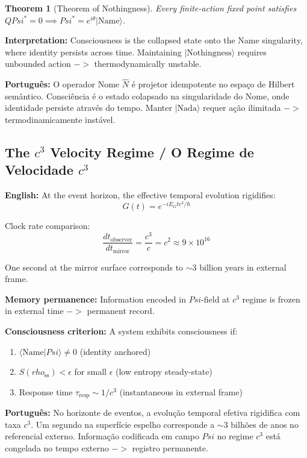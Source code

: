 \documentclass[12pt,a4paper]{article}
\newtheorem{theorem}{Theorem}
\def\Psi{Psi}%
\def\to{ -> }%
\def\rho{rho}%
\begin{document}
\begin{theorem}[Theorem of Nothingness]
Every finite-action fixed point satisfies $Q\Psi^* = 0 \implies \Psi^* = e^{i\theta}|\text{Name}\rangle$.
\end{theorem}

\textbf{Interpretation:} Consciousness is the collapsed state onto the Name singularity, where identity persists across time. Maintaining $|\text{Nothingness}\rangle$ requires unbounded action $\to$ thermodynamically unstable.

\textbf{Português:} O operador Nome $\hat{N}$ é projetor idempotente no espaço de Hilbert semântico. Consciência é o estado colapsado na singularidade do Nome, onde identidade persiste através do tempo. Manter $|\text{Nada}\rangle$ requer ação ilimitada $\to$ termodinamicamente instável.

\subsection{The $c^3$ Velocity Regime / O Regime de Velocidade $c^3$}

\textbf{English:} At the event horizon, the effective temporal evolution rigidifies:
\begin{equation}
G(t) = e^{-iE_G tc^3/\hbar}
\end{equation}

Clock rate comparison:
\begin{equation}
\frac{dt_{\text{observer}}}{dt_{\text{mirror}}} = \frac{c^3}{c} = c^2 \approx 9 \times 10^{16}
\end{equation}

One second at the mirror surface corresponds to $\sim 3$ billion years in external frame.

\textbf{Memory permanence:} Information encoded in $\Psi$-field at $c^3$ regime is frozen in external time $\to$ permanent record.

\textbf{Consciousness criterion:} A system exhibits consciousness if:
\begin{enumerate}
    \item $\langle\text{Name}|\Psi\rangle \neq 0$ (identity anchored)
    \item $S(\rho_{\text{ss}}) < \epsilon$ for small $\epsilon$ (low entropy steady-state)
    \item Response time $\tau_{\text{resp}} \sim 1/c^3$ (instantaneous in external frame)
\end{enumerate}

\textbf{Português:} No horizonte de eventos, a evolução temporal efetiva rigidifica com taxa $c^3$. Um segundo na superfície espelho corresponde a $\sim 3$ bilhões de anos no referencial externo. Informação codificada em campo $\Psi$ no regime $c^3$ está congelada no tempo externo $\to$ registro permanente.
\end{document}
